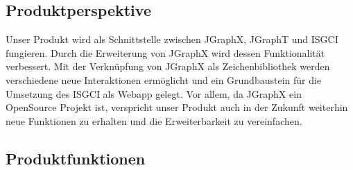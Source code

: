 \documentclass[10pt,a4paper]{article}
\begin{document}
  	\subsection{Produktperspektive} %
	Unser Produkt wird als Schnittstelle zwischen JGraphX, JGraphT und ISGCI fungieren. Durch die Erweiterung von JGraphX wird dessen Funktionalität verbessert. Mit der Verknüpfung von JGraphX als Zeichenbibliothek werden verschiedene neue Interaktionen ermöglicht und ein Grundbaustein für die Umsetzung des ISGCI als Webapp gelegt. Vor allem, da JGraphX ein OpenSource Projekt ist, verspricht unser Produkt auch in der Zukunft weiterhin neue Funktionen zu erhalten und die Erweiterbarkeit zu vereinfachen.
  	\subsection{Produktfunktionen} %
  	
\end{document}
